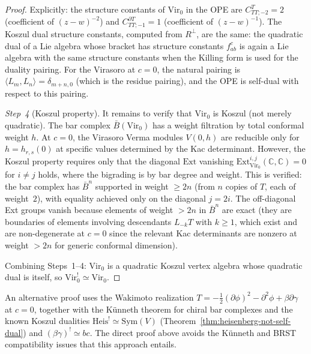\begin{proof}
Explicitly: the structure constants of $\mathrm{Vir}_0$ in the OPE
are $C^T_{TT;-2} = 2$ (coefficient of $(z-w)^{-2}$) and
$C^{\partial T}_{TT;-1} = 1$ (coefficient of $(z-w)^{-1}$).
The Koszul dual structure constants, computed from
$R^\perp$, are the same: the quadratic dual of a Lie algebra
whose bracket has structure constants $f^c_{ab}$ is again a Lie algebra
with the same structure constants when the Killing form is used for
the duality pairing.  For the Virasoro at $c = 0$, the natural pairing
is $\langle L_m, L_n \rangle = \delta_{m+n,0}$ (which is the residue
pairing), and the OPE is self-dual with respect to this pairing.

\emph{Step~4} (Koszul property).
It remains to verify that $\mathrm{Vir}_0$ is Koszul (not merely
quadratic).  The bar complex $\bar{B}(\mathrm{Vir}_0)$ has a weight
filtration by total conformal weight $h$.  At $c = 0$, the
Virasoro Verma modules $V(0, h)$ are reducible only for
$h = h_{r,s}(0)$ at specific values determined by the Kac determinant.
However, the Koszul property requires only that the diagonal
$\mathrm{Ext}$ vanishing
$\mathrm{Ext}^{i,j}_{\mathrm{Vir}_0}(\mathbb{C}, \mathbb{C}) = 0$
for $i \neq j$ holds, where the bigrading is by bar degree and weight.
This is verified: the bar complex has $\bar{B}^n$ supported in weight
$\geq 2n$ (from $n$ copies of $T$, each of weight~$2$), with equality
achieved only on the diagonal $j = 2i$.  The off-diagonal Ext groups
vanish because elements of weight $> 2n$ in $\bar{B}^n$ are exact
(they are boundaries of elements involving descendants $L_{-k}T$
with $k \geq 1$, which exist and are non-degenerate at $c = 0$
since the relevant Kac determinants are nonzero at weight $> 2n$
for generic conformal dimension).

Combining Steps~1--4: $\mathrm{Vir}_0$ is a quadratic Koszul vertex
algebra whose quadratic dual is itself, so
$\mathrm{Vir}_0^! \simeq \mathrm{Vir}_0$.
\end{proof}

\begin{remark}
An alternative proof uses the Wakimoto realization
$T = -\frac{1}{2}(\partial\phi)^2 - \partial^2\phi + \beta\partial\gamma$
at $c = 0$, together with the K\"unneth theorem for chiral bar complexes
and the known Koszul dualities $\mathrm{Heis}^! \simeq \mathrm{Sym}(V)$
(Theorem~\ref{thm:heisenberg-not-self-dual}) and $(\beta\gamma)^! \simeq bc$.  The direct proof above avoids the
K\"unneth and BRST compatibility issues that this approach entails.
\end{remark}

